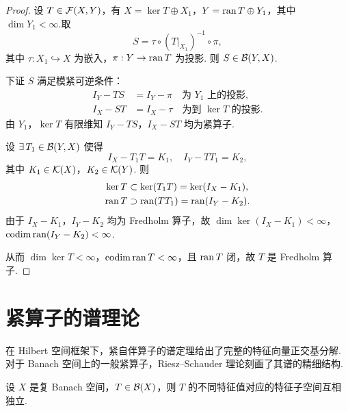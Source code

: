 \begin{proof}
\fbox{$\Rightarrow$} 设 $T \in \mathcal{F}(X,Y)$，有 $X = \ker T \oplus X_1$，$Y = \operatorname{ran} T \oplus Y_1$，其中 $\dim Y_1 < \infty$.取
\begin{equation*}
S = \tau \circ (T|_{X_1})^{-1} \circ \pi,
\end{equation*}
其中 $\tau: X_1 \hookrightarrow X$ 为嵌入，$\pi: Y \to \operatorname{ran} T$ 为投影. 则 $S \in \mathcal{B}(Y,X)$.\par
下证 $S$ 满足模紧可逆条件：
\begin{align*}
I_Y - TS &= I_Y - \pi \quad\text{为 $Y_1$ 上的投影},\\
I_X - ST &= I_X - \tau \quad\text{为到 $\ker T$ 的投影}.
\end{align*}
由 $Y_1$，$\ker T$ 有限维知 $I_Y-TS$，$I_X-ST$ 均为紧算子.\par
\fbox{$\Leftarrow$} 设 $\exists\, T_1 \in \mathcal{B}(Y,X)$ 使得
\begin{equation*}
I_X - T_1T = K_1,\quad I_Y - TT_1 = K_2,
\end{equation*}
其中 $K_1 \in \mathcal{K}(X)$，$K_2 \in \mathcal{K}(Y)$. 则
\begin{align*}
\ker T &\subset \ker(T_1T) = \ker(I_X-K_1),\\
\operatorname{ran} T &\supset \operatorname{ran}(TT_1) = \operatorname{ran}(I_Y-K_2).
\end{align*}
由于 $I_X-K_1$，$I_Y-K_2$ 均为 Fredholm 算子，故 $\dim\ker(I_X-K_1) < \infty$，$\operatorname{codim}\operatorname{ran}(I_Y-K_2) < \infty$.\par
从而 $\dim\ker T < \infty$，$\operatorname{codim}\operatorname{ran} T < \infty$，且 $\operatorname{ran} T$ 闭，故 $T$ 是 Fredholm 算子.
\end{proof}

\section{紧算子的谱理论}

在 Hilbert 空间框架下，紧自伴算子的谱定理给出了完整的特征向量正交基分解. 对于 Banach 空间上的一般紧算子，Riesz--Schauder 理论刻画了其谱的精细结构.

\begin{proposition}[特征子空间的独立性]\label{prop:eigenspace-independence}
设 $X$ 是复 Banach 空间，$T \in \mathcal{B}(X)$，则 $T$ 的不同特征值对应的特征子空间互相独立.
\end{proposition}

